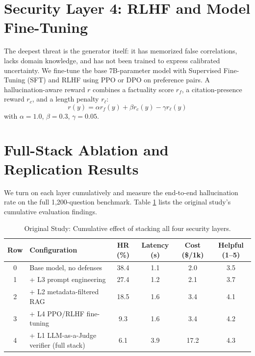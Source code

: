 \documentclass[11pt,a4paper]{article}
\begin{document}
\section{Security Layer 4: RLHF and Model Fine-Tuning}
The deepest threat is the generator itself: it has memorized false correlations, lacks domain knowledge, and has not been trained to express calibrated uncertainty. We fine-tune the base 7B-parameter model with Supervised Fine-Tuning (SFT) and RLHF using PPO \cite{16} or DPO \cite{17} on preference pairs. A hallucination-aware reward $r$ combines a factuality score $r_f$, a citation-presence reward $r_c$, and a length penalty $r_\ell$:
\begin{equation}
r(y) = \alpha r_f(y) + \beta r_c(y) - \gamma r_\ell(y)
\end{equation}
with $\alpha = 1.0$, $\beta = 0.3$, $\gamma = 0.05$.

\section{Full-Stack Ablation and Replication Results}
We turn on each layer cumulatively and measure the end-to-end hallucination rate on the full 1,200-question benchmark. Table \ref{tab:original_ablation} lists the original study's cumulative evaluation findings.

\begin{table}[ht]
\centering
\caption{Original Study: Cumulative effect of stacking all four security layers.}
\label{tab:original_ablation}
\begin{tabular}{clcccc}
\hline
\textbf{Row} & \textbf{Configuration} & \textbf{HR (\%)} & \textbf{Latency (s)} & \textbf{Cost (\$/1k)} & \textbf{Helpful (1--5)} \\ \hline
0 & Base model, no defenses & 38.4 & 1.1 & 2.0 & 3.5 \\
1 & + L3 prompt engineering & 27.4 & 1.2 & 2.1 & 3.7 \\
2 & + L2 metadata-filtered RAG & 18.5 & 1.6 & 3.4 & 4.1 \\
3 & + L4 PPO/RLHF fine-tuning & 9.3 & 1.6 & 3.4 & 4.2 \\
4 & + L1 LLM-as-a-Judge verifier (full stack) & 6.1 & 3.9 & 17.2 & 4.3 \\ \hline
\end{tabular}
\end{table}
\end{document}
